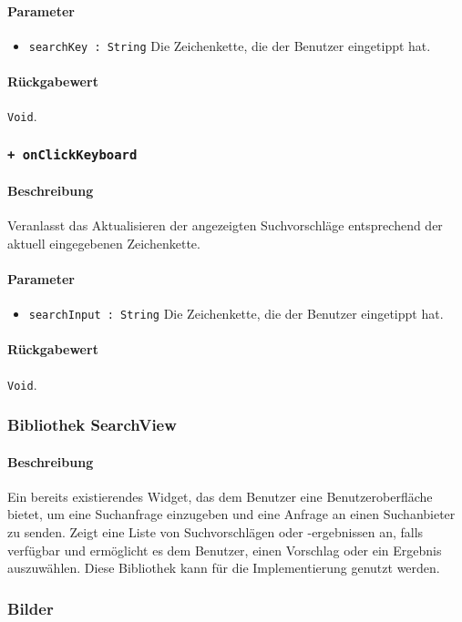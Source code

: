 \paragraph*{Parameter}
\begin{itemize}
    \item \texttt{searchKey : String} Die Zeichenkette, die der Benutzer eingetippt hat.
\end{itemize}
\paragraph*{Rückgabewert}
\texttt{Void}.

\subsubsection*{\texttt{+ onClickKeyboard}}%
\paragraph*{Beschreibung}
Veranlasst das Aktualisieren der angezeigten Suchvorschläge entsprechend der aktuell eingegebenen Zeichenkette.
\paragraph*{Parameter}
\begin{itemize}
    \item \texttt{searchInput : String} Die Zeichenkette, die der Benutzer eingetippt hat.
\end{itemize}
\paragraph*{Rückgabewert}
\texttt{Void}.


\subsubsection*{Bibliothek SearchView}
\paragraph*{Beschreibung}
Ein bereits existierendes Widget, das dem Benutzer eine Benutzeroberfläche bietet, um eine Suchanfrage einzugeben und eine Anfrage an einen Suchanbieter zu senden. 
Zeigt eine Liste von Suchvorschlägen oder -ergebnissen an, falls verfügbar 
und ermöglicht es dem Benutzer, einen Vorschlag oder ein Ergebnis auszuwählen.
Diese Bibliothek kann für die Implementierung genutzt werden.

\subsubsection*{Bilder}
\begin{minipage}{\linewidth}
    \centering
    \begin{minipage}{.49\textwidth}
        \captionsetup[figure]{labelformat=empty}
        \captionsetup[figure]{labelformat=default}
    \end{minipage}
\end{minipage}